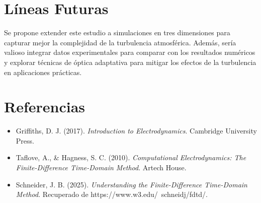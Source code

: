 \section{Líneas Futuras}

Se propone extender este estudio a simulaciones en tres dimensiones para capturar mejor la complejidad de la turbulencia atmosférica. Además, sería valioso integrar datos experimentales para comparar con los resultados numéricos y explorar técnicas de óptica adaptativa para mitigar los efectos de la turbulencia en aplicaciones prácticas.

\section{Referencias}

\begin{itemize}
    \item Griffiths, D. J. (2017). \textit{Introduction to Electrodynamics}. Cambridge University Press.
    \item Taflove, A., \& Hagness, S. C. (2010). \textit{Computational Electrodynamics: The Finite-Difference Time-Domain Method}. Artech House.
    \item Schneider, J. B. (2025). \textit{Understanding the Finite-Difference Time-Domain Method}. Recuperado de https://www.w3.edu/~schneidj/fdtd/.
\end{itemize}

